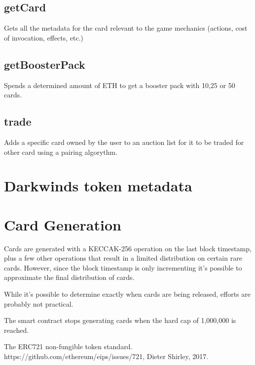 \documentclass[11pt,twocolumn]{article}
\begin{document}
\subsection{getCard}
Gets all the metadata for the card relevant to the game mechanics (actions, cost of invocation, effects, etc.)
\subsection{getBoosterPack}
Spends a determined amount of ETH to get a booster pack with 10,25 or 50 cards.
\subsection{trade}
Adds a specific card owned by the user to an auction list for it to be traded for other card using a pairing algorythm.

\section{Darkwinds token metadata}
\section{Card Generation}
Cards are generated with a KECCAK-256 operation on the last block timestamp, plus a few other operations that result in a limited distribution on certain rare cards. However, since the block timestamp is only incrementing it's possible to approximate the final distribution of cards.

While it's possible to determine exactly when cards are being released, efforts are probably not practical. 

The smart contract stops generating cards when the hard cap of 1,000,000 is reached.
\begin{thebibliography}{1}

         The ERC721 non-fungible token standard. https://github.com/ethereum/eips/issues/721, Dieter Shirley, 2017.
      
        \end{thebibliography}
\end{document}
